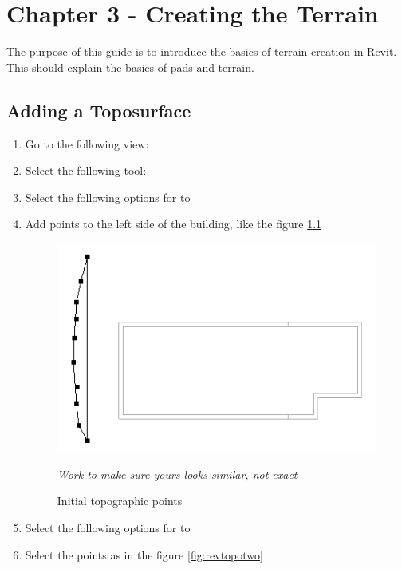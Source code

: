 \documentclass{tufte-book} %
\begin{document}
\chapter{Chapter 3 - Creating the Terrain}
The purpose of this guide is to introduce the basics of terrain creation in Revit. This should explain the basics of pads and terrain.
\section{Adding a Toposurface}
\begin{enumerate}
	\item Go to the following view: 
	\item Select the following tool: 
	\item Select the following options for  to 
	\item Add points to the left side of the building, like the figure \ref{fig:revtopoinit}
	\begin{figure}
		\includegraphics[width=\linewidth]{revittopographicinitial.png}
		\caption{Initial topographic points}
		\emph{Work to make sure yours looks similar, not exact}
		\label{fig:revtopoinit}
	\end{figure}
	\item Select the following options for  to 
	\item Select the points as in the figure \ref{fig:revtopotwo}
	\begin{figure}

\end{figure}
\end{enumerate}
\end{document}
